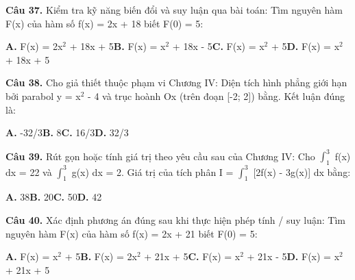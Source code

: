 \documentclass[11pt,a4paper]{article}
\begin{document}
\textbf{\color{primary} Câu 37.} Kiểm tra kỹ năng biến đổi và suy luận qua bài toán: Tìm nguyên hàm F(x) của hàm số f(x) = 2x + 18 biết F(0) = 5:\par
\hspace*{1.5em}\textbf{A.} F(x) = 2x$^2$ + 18x + 5\quad\quad \textbf{B.} F(x) = x$^2$ + 18x - 5\quad\quad \textbf{C.} F(x) = x$^2$ + 5\quad\quad \textbf{D.} F(x) = x$^2$ + 18x + 5\par\vspace{2pt}
\textbf{\color{primary} Câu 38.} Cho giả thiết thuộc phạm vi Chương IV: Diện tích hình phẳng giới hạn bởi parabol y = x$^2$ - 4 và trục hoành Ox (trên đoạn [-2; 2]) bằng. Kết luận đúng là:\par
\hspace*{1.5em}\textbf{A.} -32/3\quad\quad \textbf{B.} 8\quad\quad \textbf{C.} 16/3\quad\quad \textbf{D.} 32/3\par\vspace{2pt}
\textbf{\color{primary} Câu 39.} Rút gọn hoặc tính giá trị theo yêu cầu sau của Chương IV: Cho $\int_{1}^{3}$ f(x) dx = 22 và $\int_{1}^{3}$ g(x) dx = 2. Giá trị của tích phân I = $\int_{1}^{3}$ [2f(x) - 3g(x)] dx bằng:\par
\hspace*{1.5em}\textbf{A.} 38\quad\quad \textbf{B.} 20\quad\quad \textbf{C.} 50\quad\quad \textbf{D.} 42\par\vspace{2pt}
\textbf{\color{primary} Câu 40.} Xác định phương án đúng sau khi thực hiện phép tính / suy luận: Tìm nguyên hàm F(x) của hàm số f(x) = 2x + 21 biết F(0) = 5:\par
\hspace*{1.5em}\textbf{A.} F(x) = x$^2$ + 5\quad\quad \textbf{B.} F(x) = 2x$^2$ + 21x + 5\quad\quad \textbf{C.} F(x) = x$^2$ + 21x - 5\quad\quad \textbf{D.} F(x) = x$^2$ + 21x + 5\par\vspace{2pt}
\end{document}
